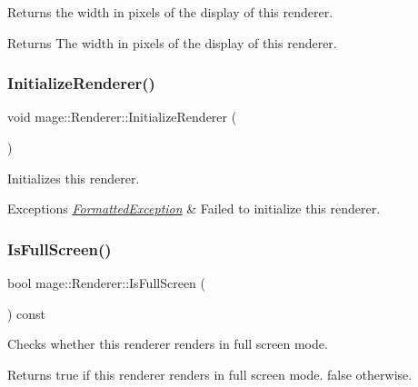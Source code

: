 Returns the width in pixels of the display of this renderer.

\begin{DoxyReturn}{Returns}
The width in pixels of the display of this renderer. 
\end{DoxyReturn}
\hypertarget{classmage_1_1_renderer_a2bb7f4e41ef6db047ce3023ed4e5d0c1}{}\label{classmage_1_1_renderer_a2bb7f4e41ef6db047ce3023ed4e5d0c1} 
\subsubsection{\texorpdfstring{Initialize\+Renderer()}{InitializeRenderer()}}
{\footnotesize\ttfamily void mage\+::\+Renderer\+::\+Initialize\+Renderer (\begin{DoxyParamCaption}{ }\end{DoxyParamCaption})\hspace{0.3cm}{\ttfamily [private]}}

Initializes this renderer.


\begin{DoxyExceptions}{Exceptions}
{\em \hyperlink{structmage_1_1_formatted_exception}{Formatted\+Exception}} & Failed to initialize this renderer. \\
\hline
\end{DoxyExceptions}
\hypertarget{classmage_1_1_renderer_a5ae3220e19c68f47a8e4d55e3ced4694}{}\label{classmage_1_1_renderer_a5ae3220e19c68f47a8e4d55e3ced4694} 
\subsubsection{\texorpdfstring{Is\+Full\+Screen()}{IsFullScreen()}}
{\footnotesize\ttfamily bool mage\+::\+Renderer\+::\+Is\+Full\+Screen (\begin{DoxyParamCaption}{ }\end{DoxyParamCaption}) const}

Checks whether this renderer renders in full screen mode.

\begin{DoxyReturn}{Returns}
{\ttfamily true} if this renderer renders in full screen mode. {\ttfamily false} otherwise. 
\end{DoxyReturn}
\hypertarget{classmage_1_1_renderer_a1de1804c1eedae7dc12435a520a10b9c}{}\label{classmage_1_1_renderer_a1de1804c1eedae7dc12435a520a10b9c} 
